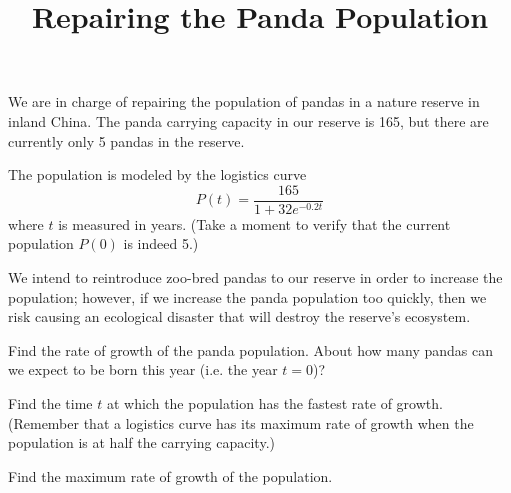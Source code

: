 \documentclass{letter}
\title{Repairing the Panda Population}
\begin{document}
  We are in charge of repairing the population of pandas in a nature reserve in inland China. The panda carrying capacity in our reserve is 165, but there are currently only 5 pandas in the reserve.

  The population is modeled by the logistics curve
  \[
    P(t) = \frac{165}{1 + 32 e^{-0.2t}}
  \]
  where $t$ is measured in years. (Take a moment to verify that the current population $P(0)$ is indeed 5.)

  We intend to reintroduce zoo-bred pandas to our reserve in order to increase the population; however, if we increase the panda population too quickly, then we risk causing an ecological disaster that will destroy the reserve's ecosystem.

  \begin{problem}{}
    Find the rate of growth of the panda population. About how many pandas can we expect to be born this year (i.e. the year $t = 0$)?

  \end{problem}

  \begin{problem}{}
    Find the time $t$ at which the population has the fastest rate of growth. (Remember that a logistics curve has its maximum rate of growth when the population is at half the carrying capacity.)

  \end{problem}

  \begin{problem}{}
    Find the maximum rate of growth of the population.

  \end{problem}
\end{document}
